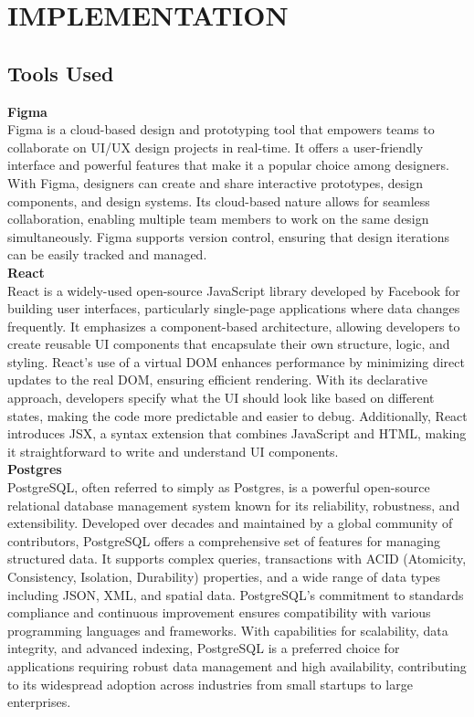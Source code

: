 \chapter{IMPLEMENTATION}





\section{Tools Used}
\textbf{Figma}\\
Figma is a cloud-based design and prototyping tool that empowers teams to collaborate on UI/UX design projects in real-time. It offers a user-friendly interface and powerful features that make it a popular choice among designers. With Figma, designers can create and share interactive prototypes, design components, and design systems. Its cloud-based nature allows for seamless collaboration, enabling multiple team members to work on the same design simultaneously. Figma supports version control, ensuring that design iterations can be easily tracked and managed. \\
\textbf{React}\\
React is a widely-used open-source JavaScript library developed by Facebook for building user interfaces, particularly single-page applications where data changes frequently. It emphasizes a component-based architecture, allowing developers to create reusable UI components that encapsulate their own structure, logic, and styling. React’s use of a virtual DOM enhances performance by minimizing direct updates to the real DOM, ensuring efficient rendering. With its declarative approach, developers specify what the UI should look like based on different states, making the code more predictable and easier to debug. Additionally, React introduces JSX, a syntax extension that combines JavaScript and HTML, making it straightforward to write and understand UI components.\\
\textbf{Postgres}\\
PostgreSQL, often referred to simply as Postgres, is a powerful open-source relational database management system known for its reliability, robustness, and extensibility. Developed over decades and maintained by a global community of contributors, PostgreSQL offers a comprehensive set of features for managing structured data. It supports complex queries, transactions with ACID (Atomicity, Consistency, Isolation, Durability) properties, and a wide range of data types including JSON, XML, and spatial data. PostgreSQL's commitment to standards compliance and continuous improvement ensures compatibility with various programming languages and frameworks. With capabilities for scalability, data integrity, and advanced indexing, PostgreSQL is a preferred choice for applications requiring robust data management and high availability, contributing to its widespread adoption across industries from small startups to large enterprises. \\
